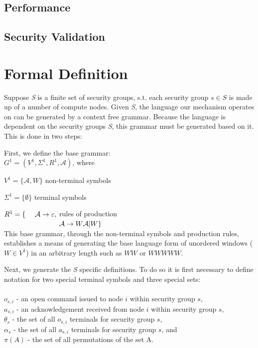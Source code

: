 \documentclass{llncs}
\newcommand{\tab}{\hspace*{2em}}
\begin{document}
\subsection{Performance}
\subsection{Security Validation}
\section{Formal Definition}

Suppose \emph{S} is a finite set of security groups, s.t. each security group $s\in S$ is made up of a number of compute nodes. Given \emph{S}, the language our mechanism operates on can be generated by a context free grammar. Because the language is dependent on the security groups \emph{S}, this grammar must be generated based on it. This is done in two steps:

First, we define the base grammar:\\

\tab $G^1 = (V^1, \Sigma^1, R^1, \mathcal{A})$, where

\tab $V^1 = \{\mathcal{A} , W\}$ \hfill non-terminal symbols \hspace*{6em}

\tab $\Sigma ^1 = \{ \emptyset\}$ \hfill terminal symbols\hspace*{6.3em}

\tab $R^1 = \lbrace \hspace*{1.35em}\mathcal{A} \rightarrow \varepsilon ,$ \hfill rules of production \hspace*{6em} \\
$\tab \hspace*{5.9em} \mathcal{A}\rightarrow W\mathcal{A} |W\rbrace$\\

This base grammar, through the non-terminal symbols and production rules, establishes a means of generating the base language form of unordered windows ($W\in V^1$) in an arbitrary length such as $WW$ or $WWWWW$.

Next, we generate the \emph{S} specific definitions. To do so it is first necessary to define notation for two special terminal symbols and three special sets:\\
\\
$o_{s,i}$ - an open command issued to node $i$ within security group $s$,\\
$a_{s,i}$ - an acknowledgement received from node $i$ within security group $s$,\\
$\theta_s$ - the set of all $o_{s,i}$ terminals for security group $s$, \\
$\alpha_s$ - the set of all $a_{s,i}$ terminals for security group $s$, and \\
$\pi(A)$ - the set of all permutations of the set A.\\
\end{document}
